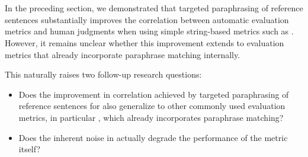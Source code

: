 \section{\parmesan}
\label{parmesan}





In the preceding section, we demonstrated that targeted paraphrasing of reference sentences substantially improves the correlation between automatic evaluation metrics and human judgments when using simple string-based metrics such as \bleu. However, it remains unclear whether this improvement extends to evaluation metrics that already incorporate paraphrase matching internally.

\begin{mdframed}[
    linecolor=gray,
    linewidth=2pt,
    roundcorner=5,
    backgroundcolor=gray!5
]
\noindent This naturally raises two follow-up research questions: 

\begin{itemize}
    \item Does the improvement in correlation achieved by targeted paraphrasing of reference sentences for \bleu also generalize to other commonly used evaluation metrics, in particular \mn, which already incorporates paraphrase matching?
    \item Does the inherent noise in \cmpt actually degrade the performance of the \mn metric itself?
\end{itemize}

\end{mdframed}



